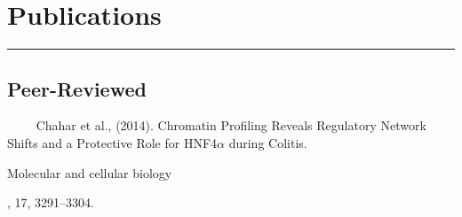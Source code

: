 \documentclass[letterpaper]{deedy-resume} %
\newcommand{\colorrule}[1]{%
\begingroup\color{#1}\hrule\endgroup%
}%
\begin{document}
\sectionspace %


\section{Publications}
\normalfont
\colorrule{black}
\vspace{2 mm}
\subsection{Peer-Reviewed}
\quad \ \ \textbullet{} \ \ Chahar et al., (2014). Chromatin Profiling Reveals Regulatory Network Shifts and a Protective Role for HNF4$\alpha$ during \hspace*{8 mm} Colitis. \begin{em}Molecular and cellular biology\end{em}, 17, 3291–3304.
%
%



\end{document}
